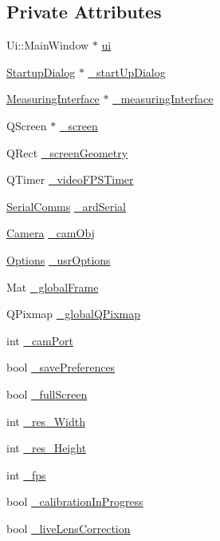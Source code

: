 \subsection*{Private Attributes}
\begin{DoxyCompactItemize}
\item 
Ui\+::\+Main\+Window $\ast$ \mbox{\hyperlink{classMainWindow_a35466a70ed47252a0191168126a352a5}{ui}}
\item 
\mbox{\hyperlink{classStartupDialog}{Startup\+Dialog}} $\ast$ \mbox{\hyperlink{classMainWindow_a850dd2c4a3175dffc1ca0aff45f90df2}{\+\_\+start\+Up\+Dialog}}
\item 
\mbox{\hyperlink{classMeasuringInterface}{Measuring\+Interface}} $\ast$ \mbox{\hyperlink{classMainWindow_a1af24c9acb6190fbd2e94e9fd7e47fa5}{\+\_\+measuring\+Interface}}
\item 
Q\+Screen $\ast$ \mbox{\hyperlink{classMainWindow_aaca1bb52c5de2823d0d2ebda6a074fed}{\+\_\+screen}}
\item 
Q\+Rect \mbox{\hyperlink{classMainWindow_a87aaa571db28f88942b781c44eac7ba5}{\+\_\+screen\+Geometry}}
\item 
Q\+Timer \mbox{\hyperlink{classMainWindow_a13da2145ec632c79dd1c61ec1bd7a792}{\+\_\+video\+F\+P\+S\+Timer}}
\item 
\mbox{\hyperlink{classSerialComms}{Serial\+Comms}} \mbox{\hyperlink{classMainWindow_a06b8d20af620251ae9bb2f4ffea9a472}{\+\_\+ard\+Serial}}
\item 
\mbox{\hyperlink{classCamera}{Camera}} \mbox{\hyperlink{classMainWindow_a3b33eb0a1b29e1f1005e31279043d2b6}{\+\_\+cam\+Obj}}
\item 
\mbox{\hyperlink{structOptions}{Options}} \mbox{\hyperlink{classMainWindow_a0f1a92e35aed746b3e7666e7d62b8605}{\+\_\+usr\+Options}}
\item 
Mat \mbox{\hyperlink{classMainWindow_a69d1e60b19121dcf294a0b3085c18b31}{\+\_\+global\+Frame}}
\item 
Q\+Pixmap \mbox{\hyperlink{classMainWindow_a9519bc24e6ce9e25bbfb4c9b71e34fb4}{\+\_\+global\+Q\+Pixmap}}
\item 
int \mbox{\hyperlink{classMainWindow_a5e65a36ced82042fab3dfa4cb225072b}{\+\_\+cam\+Port}}
\item 
bool \mbox{\hyperlink{classMainWindow_a7038f323814ea36cb1b8ae38a1843a9f}{\+\_\+save\+Preferences}}
\item 
bool \mbox{\hyperlink{classMainWindow_a73ad23682185e721c6bb66991b0029b4}{\+\_\+full\+Screen}}
\item 
int \mbox{\hyperlink{classMainWindow_a6f70106c1d2c57eef08abf88e5c0847a}{\+\_\+res\+\_\+\+Width}}
\item 
int \mbox{\hyperlink{classMainWindow_a1dae0305fb0a9f530830bf59e390bcb6}{\+\_\+res\+\_\+\+Height}}
\item 
int \mbox{\hyperlink{classMainWindow_ac98bad3440a4a2662a0c9cb147dcf903}{\+\_\+fps}}
\item 
bool \mbox{\hyperlink{classMainWindow_a81af7103c9294df962389000354a6ca8}{\+\_\+calibration\+In\+Progress}}
\item 
bool \mbox{\hyperlink{classMainWindow_a7e80d766f1aecdcf4385f7d1b7fb0fa0}{\+\_\+live\+Lens\+Correction}}
\end{DoxyCompactItemize}


